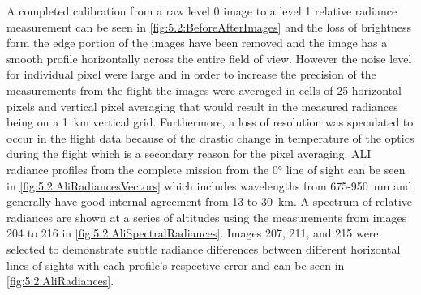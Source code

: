 A completed calibration from a raw level 0 image to a level 1 relative radiance measurement can be seen in \autoref{fig:5.2:BeforeAfterImages} and the loss of brightness form the edge portion of the images have been removed and the image has a smooth profile horizontally across the entire field of view. However the noise level for individual pixel were large and in order to increase the precision of the measurements from the flight the images were averaged in cells of 25 horizontal pixels and vertical pixel averaging that would result in the measured radiances being on a 1~km vertical grid. Furthermore, a loss of resolution was speculated to occur in the flight data because of the drastic change in temperature of the optics during the flight which is a secondary reason for the pixel averaging. ALI radiance profiles from the complete mission from the 0\si{\degree} line of sight can be seen in \autoref{fig:5.2:AliRadiancesVectors} which includes wavelengths from 675-950~nm and generally have good internal agreement from 13 to 30~km. A spectrum of relative radiances are shown at a series of altitudes using the measurements from images 204 to 216 in \autoref{fig:5.2:AliSpectralRadiances}. Images 207, 211, and 215 were selected to demonstrate subtle radiance differences between different horizontal lines of sights with each profile's respective error and can be seen in \autoref{fig:5.2:AliRadiances}. 

